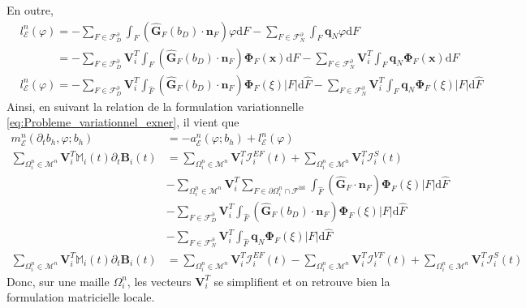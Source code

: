 \documentclass[11pt, a4paper, oneside]{report}
\begin{document}
En outre,
\begin{equation}
    \begin{aligned}
        & l_\mathcal{E}^n(\varphi) = - \sum_{F \in \mathcal{F}_D^\partial} \int_F \left( \bm{\widehat{G}}_F(b_D) \cdot \bm{n}_F \right) \varphi \text{d}F - \sum_{F \in \mathcal{F}_N^\partial} \int_F \bm{q}_N \varphi \text{d}F \\
        & \phantom{l_\mathcal{E}^n(\varphi) } = - \sum_{F \in \mathcal{F}_D^\partial} \bm{V}_i^T \int_F \left( \bm{\widehat{G}}_F(b_D) \cdot \bm{n}_F \right) \bm{\Phi}_F(\bm{x}) \text{d}F - \sum_{F \in \mathcal{F}_N^\partial} \bm{V}_i^T \int_F \bm{q}_N \bm{\Phi}_F(\bm{x}) \text{d}F \\
        & l_\mathcal{E}^n(\varphi) = - \sum_{F \in \mathcal{F}_D^\partial} \bm{V}_i^T \int_{\widehat{F}} \left( \bm{\widehat{G}}_F(b_D) \cdot \bm{n}_F \right) \bm{\Phi}_F(\xi) \lvert F \rvert \text{d}\widehat{F} - \sum_{F \in \mathcal{F}_N^\partial} \bm{V}_i^T \int_{\widehat{F}} \bm{q}_N \bm{\Phi}_F(\xi) \lvert F \rvert \text{d}\widehat{F}
    \end{aligned}
\end{equation}
Ainsi, en suivant la relation de la formulation variationnelle \eqref{eq:Probleme_variationnel_exner}, il vient que
\begin{equation}
    \begin{aligned}
        m_\mathcal{E}^n(\partial_t b_h, \varphi; b_h) & = -a_\mathcal{E}^n(\varphi; b_h) + l_\mathcal{E}^n(\varphi) \\
        \sum_{\Omega_i^n \in \mathcal{M}^n} \bm{V}_i^T \mathbb{M}_i(t) \partial_t \bm{B}_i(t) & = \sum_{\Omega_i^n \in \mathcal{M}^n} \bm{V}_i^T \bm{\mathcal{I}}_i^{EF}(t) + \sum_{\Omega_i^n \in \mathcal{M}^n} \bm{V}_i^T \bm{\mathcal{I}}_i^S(t) \\
        & - \sum_{\Omega_i^n \in \mathcal{M}^n} \bm{V}_i^T \sum_{F \in \partial \Omega_i^n \cap \mathcal{F}^\text{int}} \int_{\widehat{F}} \left( \bm{\widehat{G}}_F \cdot \bm{n}_F \right) \bm{\Phi}_F(\xi) \lvert F \rvert \text{d}\widehat{F} \\
        & - \sum_{F \in \mathcal{F}_D^\partial} \bm{V}_i^T \int_{\widehat{F}} \left( \bm{\widehat{G}}_F(b_D) \cdot \bm{n}_F \right) \bm{\Phi}_F(\xi) \lvert F \rvert \text{d}\widehat{F} \\
        & - \sum_{F \in \mathcal{F}_N^\partial} \bm{V}_i^T \int_{\widehat{F}} \bm{q}_N \bm{\Phi}_F(\xi) \lvert F \rvert \text{d}\widehat{F} \\
        \sum_{\Omega_i^n \in \mathcal{M}^n} \bm{V}_i^T \mathbb{M}_i(t) \partial_t \bm{B}_i(t) & = \sum_{\Omega_i^n \in \mathcal{M}^n} \bm{V}_i^T \bm{\mathcal{I}}_i^{EF}(t) - \sum_{\Omega_i^n \in \mathcal{M}^n} \bm{V}_i^T \bm{\mathcal{I}}_i^{VF}(t) + \sum_{\Omega_i^n \in \mathcal{M}^n} \bm{V}_i^T \bm{\mathcal{I}}_i^S(t)
    \end{aligned}
\end{equation}
Donc, sur une maille $\Omega_i^n$, les vecteurs $\bm{V}_i^T$ se simplifient et on retrouve bien la formulation matricielle locale.
\end{document}

